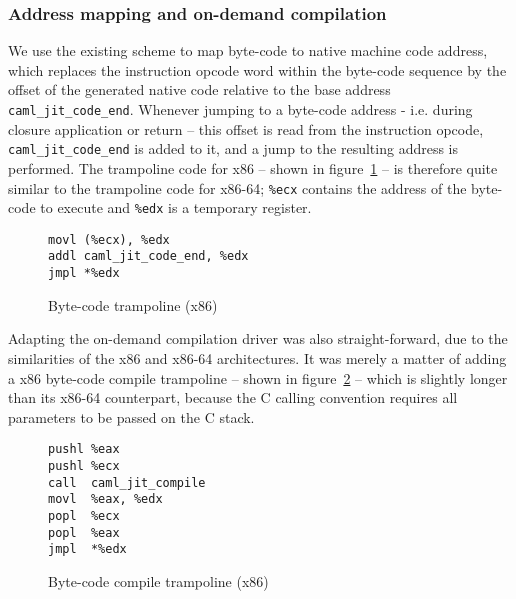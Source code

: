 \documentclass[12pt,a4paper,final]{article}
\begin{document}
\subsubsection{Address mapping and on-demand compilation}

We use the existing scheme to map byte-code to native machine code address, which
replaces the instruction opcode word within the byte-code sequence by
the offset of the generated native code relative to the base address
\texttt{caml\_jit\_code\_end}. Whenever jumping to a byte-code address - i.e.
during closure application or return -- this offset is read from the instruction
opcode, \texttt{caml\_jit\_code\_end} is added to it, and a jump to the resulting
address is performed. The trampoline code for x86 -- shown in
figure~\ref{figure:Byte_code_trampoline_x86} -- is therefore quite similar to
the trampoline code for x86-64; \texttt{\%ecx} contains the address of the
byte-code to execute and \texttt{\%edx} is a temporary register.

\begin{figure}[h]
  \centering
  \begin{varwidth}{\linewidth}
  \begin{verbatim}
movl (%ecx), %edx
addl caml_jit_code_end, %edx
jmpl *%edx
\end{verbatim}
  \end{varwidth}
  \caption{Byte-code trampoline (x86)}
  \label{figure:Byte_code_trampoline_x86}
\end{figure}

Adapting the on-demand compilation driver was also straight-forward, due to
the similarities of the x86 and x86-64 architectures. It was merely a matter
of adding a x86 byte-code compile trampoline -- shown in
figure~\ref{figure:Byte_code_compile_trampoline_x86} -- which is slightly longer
than its x86-64 counterpart, because the C calling convention \cite{SCO97Abi386}
requires all parameters to be passed on the C stack.

\begin{figure}[h]
  \centering
  \begin{varwidth}{\linewidth}
  \begin{verbatim}
pushl %eax
pushl %ecx
call  caml_jit_compile
movl  %eax, %edx
popl  %ecx
popl  %eax
jmpl  *%edx
\end{verbatim}
  \end{varwidth}
  \caption{Byte-code compile trampoline (x86)}
  \label{figure:Byte_code_compile_trampoline_x86}
\end{figure}
\end{document}
